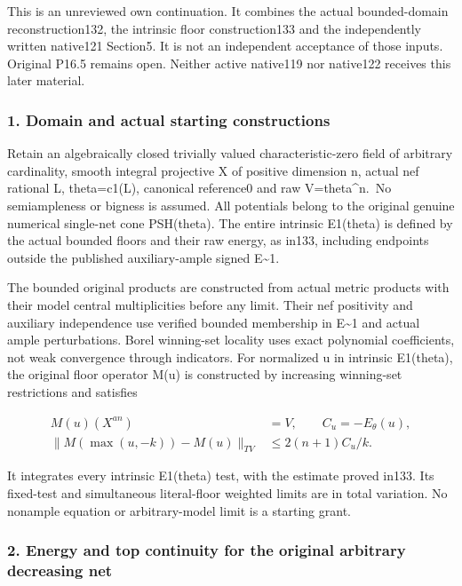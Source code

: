 \documentclass[
]{article}
\begin{document}
This is an unreviewed own continuation. It combines the actual
bounded-domain reconstruction132, the intrinsic floor construction133
and the independently written native121 Section5. It is not an
independent acceptance of those inputs. Original P16.5 remains open.
Neither active native119 nor native122 receives this later material.

\subsubsection{1. Domain and actual starting
constructions}\label{domain-and-actual-starting-constructions}

Retain an algebraically closed trivially valued characteristic-zero
field of arbitrary cardinality, smooth integral projective X of positive
dimension n, actual nef rational L, theta=c1(L), canonical reference0
and raw V=theta\^{}n.~No semiampleness or bigness is assumed. All
potentials belong to the original genuine numerical single-net cone
PSH(theta). The entire intrinsic E1(theta) is defined by the actual
bounded floors and their raw energy, as in133, including endpoints
outside the published auxiliary-ample signed E\textasciitilde1.

The bounded original products are constructed from actual metric
products with their model central multiplicities before any limit. Their
nef positivity and auxiliary independence use verified bounded
membership in E\textasciitilde1 and actual ample perturbations. Borel
winning-set locality uses exact polynomial coefficients, not weak
convergence through indicators. For normalized u in intrinsic E1(theta),
the original floor operator M(u) is constructed by increasing
winning-set restrictions and satisfies

\[\begin{aligned}
M(u)(X^{an})&=V,\qquad C_u=-E_\theta(u),\\
\|M(\max(u,-k))-M(u)\|_{TV}&\le 2(n+1)C_u/k.
\end{aligned}\]

It integrates every intrinsic E1(theta) test, with the estimate proved
in133. Its fixed-test and simultaneous literal-floor weighted limits are
in total variation. No nonample equation or arbitrary-model limit is a
starting grant.

\subsubsection{2. Energy and top continuity for the original arbitrary
decreasing
net}\label{energy-and-top-continuity-for-the-original-arbitrary-decreasing-net}
\end{document}
